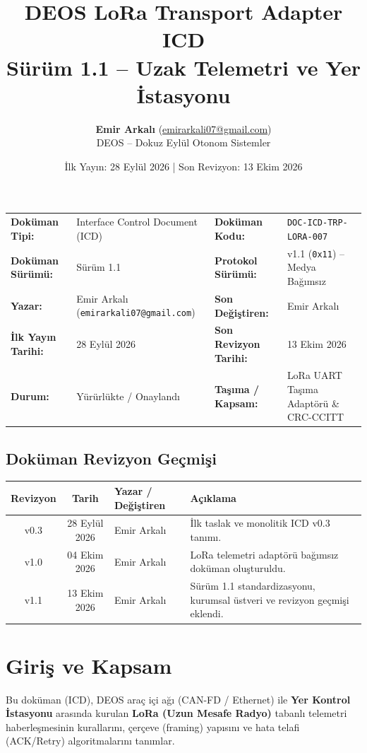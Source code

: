 \documentclass[a4paper,10pt]{article}
\title{\textbf{DEOS LoRa Transport Adapter ICD}\\
\large Sürüm 1.1 -- Uzak Telemetri ve Yer İstasyonu}
\author{\textbf{Emir Arkalı} (\href{mailto:emirarkali07@gmail.com}{emirarkali07@gmail.com})\\DEOS -- Dokuz Eylül Otonom Sistemler}
\date{İlk Yayın: 28 Eylül 2026 \quad | \quad Son Revizyon: 13 Ekim 2026}
\newcommand{\hex}[1]{\texttt{0x#1}}
\newcommand{\code}[1]{\texttt{#1}}
\begin{document}
\maketitle

\begin{center}
\small
\begin{tabularx}{\textwidth}{ll lX}
\toprule
\textbf{Doküman Tipi:} & Interface Control Document (ICD) & \textbf{Doküman Kodu:} & \code{DOC-ICD-TRP-LORA-007} \\
\textbf{Doküman Sürümü:} & Sürüm 1.1 & \textbf{Protokol Sürümü:} & v1.1 (\hex{11}) -- Medya Bağımsız \\
\textbf{Yazar:} & Emir Arkalı (\texttt{emirarkali07@gmail.com}) & \textbf{Son Değiştiren:} & Emir Arkalı \\
\textbf{İlk Yayın Tarihi:} & 28 Eylül 2026 & \textbf{Son Revizyon Tarihi:} & 13 Ekim 2026 \\
\textbf{Durum:} & Yürürlükte / Onaylandı & \textbf{Taşıma / Kapsam:} & LoRa UART Taşıma Adaptörü \& CRC-CCITT \\
\bottomrule
\end{tabularx}
\end{center}

\subsection*{Doküman Revizyon Geçmişi}
\begin{center}
\small
\begin{tabularx}{\textwidth}{c c l X}
\toprule
\textbf{Revizyon} & \textbf{Tarih} & \textbf{Yazar / Değiştiren} & \textbf{Açıklama} \\
\midrule
v0.3 & 28 Eylül 2026 & Emir Arkalı & İlk taslak ve monolitik ICD v0.3 tanımı. \\
v1.0 & 04 Ekim 2026 & Emir Arkalı & LoRa telemetri adaptörü bağımsız doküman oluşturuldu. \\
v1.1 & 13 Ekim 2026 & Emir Arkalı & Sürüm 1.1 standardizasyonu, kurumsal üstveri ve revizyon geçmişi eklendi. \\
\bottomrule
\end{tabularx}
\end{center}
\vspace{0.8em}

\section{Giriş ve Kapsam}
Bu doküman (ICD), DEOS araç içi ağı (CAN-FD / Ethernet) ile \textbf{Yer Kontrol İstasyonu} arasında kurulan \textbf{LoRa (Uzun Mesafe Radyo)} tabanlı telemetri haberleşmesinin kurallarını, çerçeve (framing) yapısını ve hata telafi (ACK/Retry) algoritmalarını tanımlar.
\end{document}
